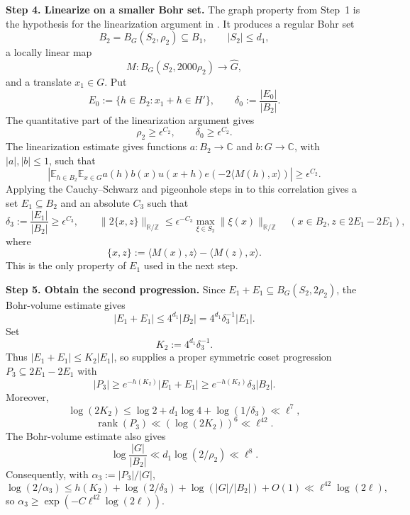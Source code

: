 \documentclass[twoside]{aomart}
\makeatletter
\theoremstyle{paperplain}
\theoremstyle{paperdefinition}
\renewenvironment{proof}[1][\proofname]{\par\pushQED{\qed}%
  \normalfont\topsep6\p@\@plus3\p@\relax\trivlist
  \item[\hskip\labelsep\itshape #1\@addpunct{.}]\ignorespaces
}{\popQED\endtrivlist\@endpefalse}
\numberwithin{equation}{section}
\makeatother
\begin{document}
\begin{proof}
\par
\medskip
\noindent\textbf{Step 4. Linearize on a smaller Bohr set.}
The graph property from Step~1 is the hypothesis for the linearization
argument in \cite[Appendix~A.2]{LengQuadratic}. It produces a regular Bohr
set
\[
 B_2=B_G(S_2,\rho_2)\subseteq B_1,\qquad |S_2|\le d_1,
\]
a locally linear map
\[
 M:B_G(S_2,2000\rho_2)\to\widehat G,
\]
and a translate $x_1\in G$. Put
\[
 E_0:=\{h\in B_2:x_1+h\in H'\},\qquad
 \delta_0:=\frac{|E_0|}{|B_2|}.
\]
The quantitative part of the linearization argument gives
\[
 \rho_2\ge\epsilon^{C_2},\qquad \delta_0\ge\epsilon^{C_2}.
\]
The linearization estimate \cite[Lemma~A.5]{LengQuadratic} gives
functions $a:B_2\to\mathbb C$ and $b:G\to\mathbb C$, with
$|a|,|b|\le1$, such that
\begin{equation}
 \left|\mathbb E_{h\in B_2}\mathbb E_{x\in G}
 a(h)b(x)u(x+h)e\!\left(-2\langle M(h),x\rangle\right)\right|
 \ge\epsilon^{C_2}.
 \label{inv:eq:linearized-correlation}
\end{equation}
Applying the Cauchy--Schwarz and pigeonhole steps in
\cite[Appendix~A.3]{LengQuadratic} to this correlation gives a
set $E_1\subseteq B_2$ and an absolute $C_3$ such that
\begin{equation}
 \delta_3:=\frac{|E_1|}{|B_2|}\ge\epsilon^{C_3},\qquad
 \|2\{x,z\}\|_{\mathbb R/\mathbb Z}
 \le\epsilon^{-C_3}\max_{\xi\in S_2}\|\xi(x)\|_{\mathbb R/\mathbb Z}
 \quad(x\in B_2, z\in2E_1-2E_1),
 \label{inv:eq:alternating-input}
\end{equation}
where
\[
 \{x,z\}:=\langle M(x),z\rangle-\langle M(z),x\rangle.
\]
This is the only property of $E_1$ used in the next step.

\par
\medskip
\noindent\textbf{Step 5. Obtain the second progression.}
Since
$E_1+E_1\subseteq B_G(S_2,2\rho_2)$, the Bohr-volume estimate gives
\[
 |E_1+E_1|\le4^{d_1}|B_2|=4^{d_1}\delta_3^{-1}|E_1|.
\]
Set
\[
 K_2:=4^{d_1}\delta_3^{-1}.
\]
Thus $|E_1+E_1|\le K_2|E_1|$, so
\cite[Lemma~A.1]{LengQuadratic} supplies a proper symmetric coset progression
$P_3\subseteq2E_1-2E_1$ with
\[
 |P_3|\ge e^{-h(K_2)}|E_1+E_1|
 \ge e^{-h(K_2)}\delta_3|B_2|.
\]
Moreover,
\begin{equation*}
 \log(2K_2)
 \le\log2+d_1\log4+\log(1/\delta_3)
 \ll\ell^7,
\end{equation*}
\begin{equation*}
 \operatorname{rank}(P_3)\ll(\log(2K_2))^6\ll\ell^{42}.
\end{equation*}
The Bohr-volume estimate also gives
\begin{equation*}
 \log\frac{|G|}{|B_2|}\ll d_1\log(2/\rho_2)\ll\ell^8.
\end{equation*}
Consequently, with $\alpha_3:=|P_3|/|G|$,
\begin{equation*}
 \log(2/\alpha_3)
 \le h(K_2)+\log(2/\delta_3)+\log(|G|/|B_2|)+O(1)
 \ll\ell^{42}\log(2\ell),
\end{equation*}
so $\alpha_3\ge\exp(-C\ell^{42}\log(2\ell))$.


\end{proof}
\end{document}
